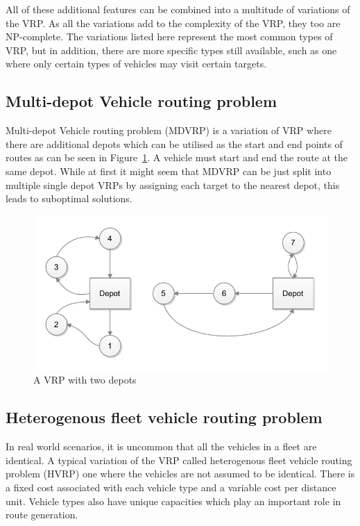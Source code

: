 All of these additional features can be combined into a multitude of variations of the VRP. As all the variations add to the complexity of the VRP, they too are NP-complete. The variations listed here represent the most common types of VRP, but in addition, there are more specific types still available, such as one where only certain types of vehicles may visit certain targets. \cite{montoya2015literature} 


\subsection{Multi-depot Vehicle routing problem}

Multi-depot Vehicle routing problem (MDVRP) is a variation of VRP where there are additional depots which can be utilised as the start and end points of routes as can be seen in Figure~\ref{fig:multidepot}. A vehicle must start and end the route at the same depot. While at first it might seem that MDVRP can be just split into multiple single depot VRPs by assigning each target to the nearest depot, this leads to suboptimal solutions. \cite{salhi2014multi}

\begin{figure}[h]
  \begin{center}
    \includegraphics{images/multidepot.pdf}
    \caption{A VRP with two depots}
    \label{fig:multidepot}
  \end{center}
\end{figure}

\subsection{Heterogenous fleet vehicle routing problem}

In real world scenarios, it is uncommon that all the vehicles in a fleet are identical. A typical variation of the VRP called heterogenous fleet vehicle routing problem (HVRP) one where the vehicles are not assumed to be identical. There is a fixed cost associated with each vehicle type and a variable cost per distance unit. Vehicle types also have unique capacities which play an important role in route generation. \cite{gendreau1999tabu}


